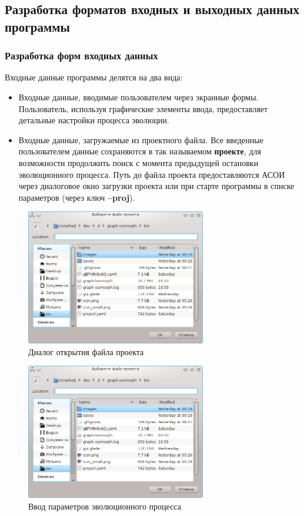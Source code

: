 \documentclass[russian,utf8,emptystyle]{eskdtext}
\begin{document}
\begin{spacing}{1.5}
\subsection{Разработка форматов входных и выходных данных программы}
\subsubsection{Разработка форм входных данных}

Входные данные программы делятся на два вида:
\begin{itemize}
\item Входные данные, вводимые пользователем через экранные формы. Пользователь, используя графические элементы ввода, предоставляет детальные настройки процесса эволюции.
\item Входные данные, загружаемые из проектного файла. Все введенные пользователем данные сохраняются в так называемом \textbf{проекте}, для возможности продолжить поиск с момента предыдущей остановки эволюционного процесса. Путь до файла проекта предоставляются АСОИ через диалоговое окно загрузки проекта или при старте программы в списке параметров (через ключ \textbf{--proj}).
\end{itemize}

\begin{figure}[h!]
\centering
\includegraphics[width=0.7\textwidth]{screen05}
\caption{Диалог открытия файла проекта}
\end{figure}

\begin{figure}[h!]
\centering
\includegraphics[width=0.7\textwidth]{screen05}
\caption{Ввод параметров эволюционного процесса}
\end{figure}


\end{spacing}
\end{document}
